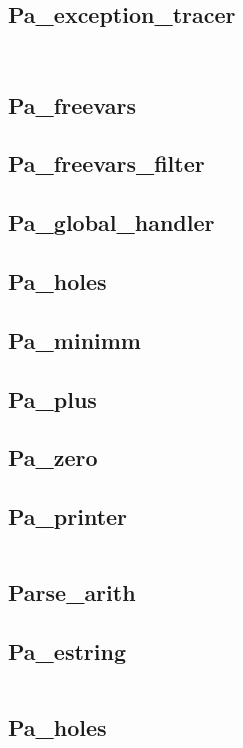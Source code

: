 \subsection{Pa\_exception\_tracer}
\inputminted[fontsize=\scriptsize]{ocaml}{camlp4/examples/pa_exception_tracer.ml}
\inputminted[fontsize=\scriptsize, fontsize=\scriptsize,
]{ocaml}{camlp4/examples/test_pa_exception_tracer.ml}


\subsection{Pa\_freevars}


\subsection{Pa\_freevars\_filter}


\subsection{Pa\_global\_handler}

\subsection{Pa\_holes}

\subsection{Pa\_minimm}


\subsection{Pa\_plus}

\subsection{Pa\_zero}
\subsection{Pa\_printer}
\inputminted[fontsize=\scriptsize]{ocaml}{camlp4/code/pa_printer/pa_printer.ml}


\subsection{Parse\_arith}


\subsection{Pa\_estring}
\inputminted[fontsize=\scriptsize]{ocaml}{camlp4/examples/pa_estring.ml}


\subsection{Pa\_holes}
